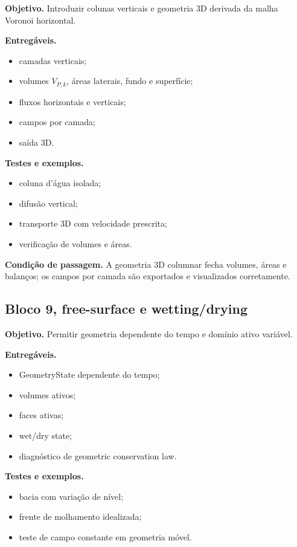 \documentclass[11pt,a4paper]{article}
\begin{document}
\textbf{Objetivo.} Introduzir colunas verticais e geometria 3D derivada da malha Voronoi horizontal.

\textbf{Entreg\'aveis.}
\begin{itemize}
  \item camadas verticais;
  \item volumes \(V_{P,k}\), \'{a}reas laterais, fundo e superf\'icie;
  \item fluxos horizontais e verticais;
  \item campos por camada;
  \item sa\'ida 3D.
\end{itemize}

\textbf{Testes e exemplos.}
\begin{itemize}
  \item coluna d'\'agua isolada;
  \item difus\~ao vertical;
  \item transporte 3D com velocidade prescrita;
  \item verifica\c{c}\~ao de volumes e \'{a}reas.
\end{itemize}

\textbf{Condi\c{c}\~ao de passagem.} A geometria 3D columnar fecha volumes, \'{a}reas e balan\c{c}os; os campos por camada s\~ao exportados e visualizados corretamente.

\subsection*{Bloco 9, free-surface e wetting/drying}

\textbf{Objetivo.} Permitir geometria dependente do tempo e dom\'inio ativo vari\'avel.

\textbf{Entreg\'aveis.}
\begin{itemize}
  \item GeometryState dependente do tempo;
  \item volumes ativos;
  \item faces ativas;
  \item wet/dry state;
  \item diagn\'ostico de geometric conservation law.
\end{itemize}

\textbf{Testes e exemplos.}
\begin{itemize}
  \item bacia com varia\c{c}\~ao de n\'ivel;
  \item frente de molhamento idealizada;
  \item teste de campo constante em geometria m\'ovel.
\end{itemize}
\end{document}
